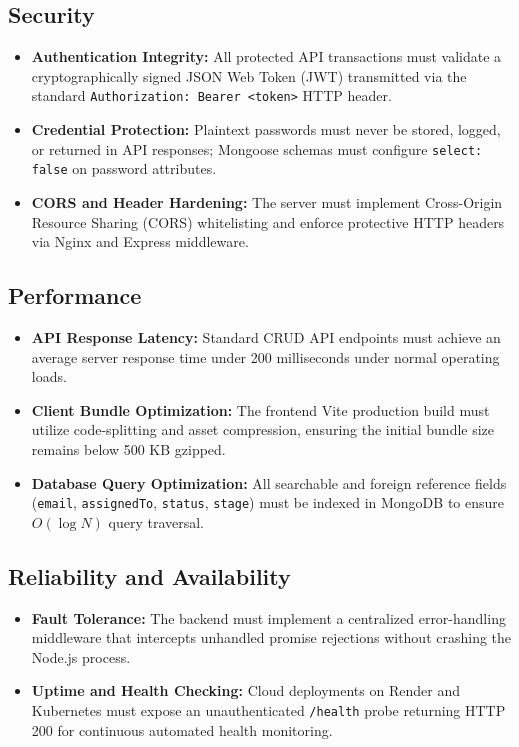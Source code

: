 \subsection{Security}
\begin{itemize}
    \item \textbf{Authentication Integrity:} All protected API transactions must validate a cryptographically signed JSON Web Token (JWT) transmitted via the standard \texttt{Authorization: Bearer <token>} HTTP header.
    \item \textbf{Credential Protection:} Plaintext passwords must never be stored, logged, or returned in API responses; Mongoose schemas must configure \texttt{select: false} on password attributes.
    \item \textbf{CORS and Header Hardening:} The server must implement Cross-Origin Resource Sharing (CORS) whitelisting and enforce protective HTTP headers via Nginx and Express middleware.
\end{itemize}

\subsection{Performance}
\begin{itemize}
    \item \textbf{API Response Latency:} Standard CRUD API endpoints must achieve an average server response time under 200 milliseconds under normal operating loads.
    \item \textbf{Client Bundle Optimization:} The frontend Vite production build must utilize code-splitting and asset compression, ensuring the initial bundle size remains below 500 KB gzipped.
    \item \textbf{Database Query Optimization:} All searchable and foreign reference fields (\texttt{email}, \texttt{assignedTo}, \texttt{status}, \texttt{stage}) must be indexed in MongoDB to ensure $O(\log N)$ query traversal.
\end{itemize}

\subsection{Reliability and Availability}
\begin{itemize}
    \item \textbf{Fault Tolerance:} The backend must implement a centralized error-handling middleware that intercepts unhandled promise rejections without crashing the Node.js process.
    \item \textbf{Uptime and Health Checking:} Cloud deployments on Render and Kubernetes must expose an unauthenticated \texttt{/health} probe returning HTTP 200 for continuous automated health monitoring.
\end{itemize}

